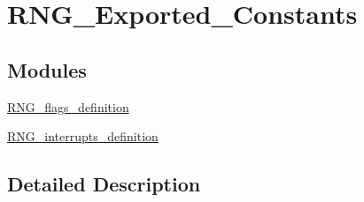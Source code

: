 \hypertarget{group___r_n_g___exported___constants}{\section{R\-N\-G\-\_\-\-Exported\-\_\-\-Constants}
\label{group___r_n_g___exported___constants}
}
\subsection*{Modules}
\begin{DoxyCompactItemize}
\item 
\hyperlink{group___r_n_g__flags__definition}{R\-N\-G\-\_\-flags\-\_\-definition}
\item 
\hyperlink{group___r_n_g__interrupts__definition}{R\-N\-G\-\_\-interrupts\-\_\-definition}
\end{DoxyCompactItemize}


\subsection{Detailed Description}
